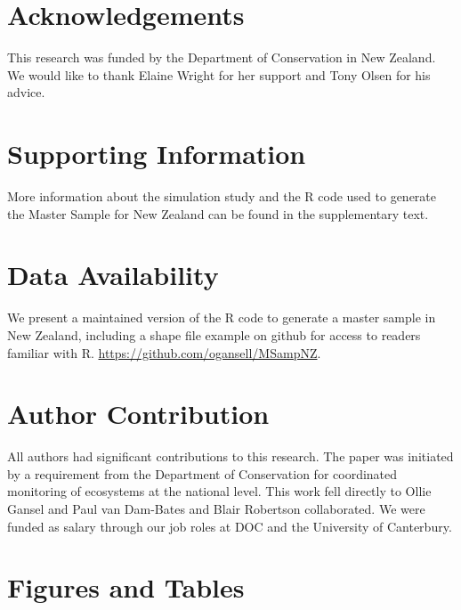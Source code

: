 \documentclass[titlepage]{article}
\begin{document}
\section{Acknowledgements}
This research was funded by the Department of Conservation in New Zealand. We would like to thank Elaine Wright for her support and Tony Olsen for his advice.

	

\section{Supporting Information}
More information about the simulation study and the R code used to generate the Master Sample for New Zealand can be found in the supplementary text.

\section{Data Availability}
We present a maintained version of the R code to generate a master sample in New Zealand, including a shape file example on github for access to readers familiar with R. \url{https://github.com/ogansell/MSampNZ}.

\section{Author Contribution}
All authors had significant contributions to this research. The paper was initiated by a requirement from the Department of Conservation for coordinated monitoring of ecosystems at the national level. This work fell directly to Ollie Gansel and Paul van Dam-Bates and Blair Robertson collaborated. We were funded as salary through our job roles at DOC and the University of Canterbury.

\newpage
\section*{Figures and Tables}
\end{document}
